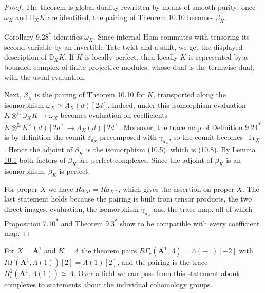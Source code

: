 \documentclass[11pt]{article}
\newcommand{\bpout}[1]{#1\textsuperscript{\hyperlink{bp-outside}{\ensuremath{\ast}}}}
\begin{document}
\begin{proof}[{Proof}]\label{bp38}%
The theorem is global duality rewritten by means of smooth purity: once \(\omega_X\) and \(\mathbb D_XK\) are identified, the pairing of Theorem \hyperref[bp32]{10.10} becomes \(\beta_K\).

Corollary \bpout{9.28} identifies \(\omega_X\). Since internal Hom commutes with tensoring its second variable by an invertible Tate twist and a shift, we get the displayed description of \(\mathbb D_XK\). If \(K\) is locally perfect, then locally \(K\) is represented by a bounded complex of finite projective modules, whose dual is the termwise dual, with the usual evaluation.

Next, \(\beta_K\) is the pairing of Theorem \hyperref[bp32]{10.10} for \(K\), transported along the isomorphism \(\omega_X\simeq\Lambda_X(d)[2d]\). Indeed, under this isomorphism evaluation \(K\otimes^{\mathbf L}\mathbb D_XK\to\omega_X\) becomes evaluation on coefficients \(K\otimes^{\mathbf L}K^\vee(d)[2d]\to\Lambda_X(d)[2d]\). Moreover, the trace map of Definition \bpout{9.24} is by definition the counit \(\varepsilon_{a_X}\) precomposed with \(\gamma_{a_X}\), so the counit becomes \(\operatorname{Tr}_X\). Hence the adjoint of \(\beta_K\) is the isomorphism (10.5), which is (10.8). By Lemma \hyperref[bp5]{10.1} both factors of \(\beta_K\) are perfect complexes. Since the adjoint of \(\beta_K\) is an isomorphism, \(\beta_K\) is perfect.

For proper \(X\) we have \(Ra_{X!}=Ra_{X*}\), which gives the assertion on proper \(X\). The last statement holds because the pairing is built from tensor products, the two direct images, evaluation, the isomorphism \(\gamma_{a_X}\) and the trace map, all of which Proposition \bpout{7.10} and Theorem \bpout{9.3} show to be compatible with every coefficient map.
\end{proof}

\label{bp39}%
For \(X=\mathbf A^1\) and \(K=\Lambda\) the theorem pairs \(R\Gamma_c(\mathbf A^1,\Lambda)=\Lambda(-1)[-2]\) with \(R\Gamma(\mathbf A^1,\Lambda(1))[2]=\Lambda(1)[2]\), and the pairing is the trace \(H^2_c(\mathbf A^1,\Lambda(1))\simeq\Lambda\). Over a field we can pass from this statement about complexes to statements about the individual cohomology groups.
\end{document}
